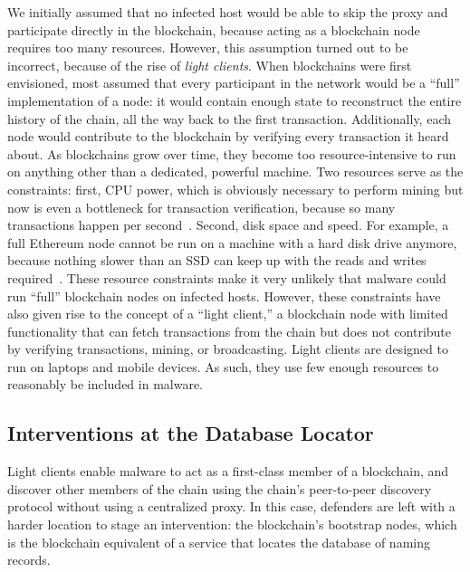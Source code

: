 We initially assumed that no infected host would be able to 
skip the proxy and participate directly 
in the blockchain, because acting as a blockchain node 
requires too many resources. However, this assumption turned 
out to be incorrect, because of the rise of \emph{light 
clients}. When blockchains were first envisioned, most 
assumed that every participant in the network would be a 
``full'' implementation of a node: it would contain 
enough state to reconstruct the entire history of the chain, 
all the way back to the first transaction. Additionally, each 
node would contribute to the 
blockchain by verifying every transaction it heard about. As 
blockchains grow over time, they become too 
resource-intensive to run on anything other than a dedicated, 
powerful machine. Two resources serve as 
the constraints: first, CPU power, which is obviously 
necessary to perform mining but now is even a bottleneck for 
transaction verification, because so many transactions happen 
per second~\cite{citation_needed}. Second, disk 
space and speed. For example, a full Ethereum node cannot be 
run on a machine with a hard disk drive anymore, because 
nothing slower than an SSD can keep up with the 
reads and writes required~\cite{citation_needed}. These 
resource constraints make it 
very unlikely that malware could run ``full'' blockchain 
nodes on infected hosts. However, these constraints have also
given rise to the concept of a ``light client,'' a blockchain 
node with limited functionality that can fetch transactions 
from the chain but does not contribute by verifying 
transactions, mining, or broadcasting. Light clients are 
designed to run on laptops and mobile devices. As such, they 
use few enough resources to reasonably be included in 
malware. 


\subsection{Interventions at the Database Locator}

Light clients enable malware to act as a first-class member 
of a blockchain, and discover other members of the chain 
using the chain's peer-to-peer discovery protocol without 
using a centralized proxy. In this case, defenders are left 
with a harder location to stage an intervention: the 
blockchain's bootstrap nodes, which is the blockchain 
equivalent of a service that locates the database of naming 
records.

